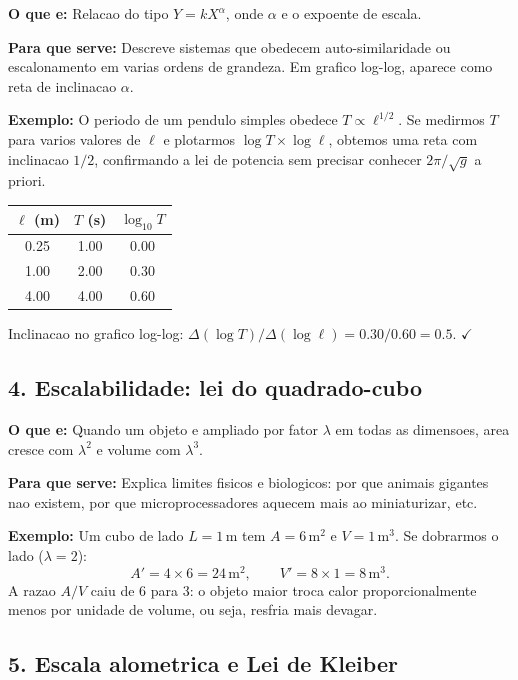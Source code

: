 \documentclass[12pt,a4paper,oneside]{book}
\theoremstyle{definition}
\begin{document}
\textbf{O que e:}
Relacao do tipo $Y = kX^\alpha$, onde $\alpha$ e o expoente de escala.

\textbf{Para que serve:}
Descreve sistemas que obedecem auto-similaridade ou escalonamento em varias ordens
de grandeza. Em grafico log-log, aparece como reta de inclinacao $\alpha$.

\textbf{Exemplo:}
O periodo de um pendulo simples obedece $T \propto \ell^{1/2}$.
Se medirmos $T$ para varios valores de $\ell$ e plotarmos $\log T \times \log \ell$,
obtemos uma reta com inclinacao $1/2$, confirmando a lei de potencia sem precisar
conhecer $2\pi/\sqrt{g}$ a priori.

\begin{center}
\begin{tabular}{ccc}
\toprule
$\ell$ (m) & $T$ (s) & $\log_{10} T$ \\
\midrule
0.25 & 1.00 & 0.00 \\
1.00 & 2.00 & 0.30 \\
4.00 & 4.00 & 0.60 \\
\bottomrule
\end{tabular}
\end{center}
Inclinacao no grafico log-log: $\Delta(\log T)/\Delta(\log \ell) = 0.30/0.60 = 0.5$. $\checkmark$

\subsection*{4. Escalabilidade: lei do quadrado-cubo}

\textbf{O que e:}
Quando um objeto e ampliado por fator $\lambda$ em todas as dimensoes,
area cresce com $\lambda^2$ e volume com $\lambda^3$.

\textbf{Para que serve:}
Explica limites fisicos e biologicos: por que animais gigantes nao existem,
por que microprocessadores aquecem mais ao miniaturizar, etc.

\textbf{Exemplo:}
Um cubo de lado $L=1\,\text{m}$ tem $A=6\,\text{m}^2$ e $V=1\,\text{m}^3$.
Se dobrarmos o lado ($\lambda=2$):
\[
A' = 4\times 6 = 24\,\text{m}^2,\qquad V' = 8\times 1 = 8\,\text{m}^3.
\]
A razao $A/V$ caiu de 6 para 3: o objeto maior troca calor proporcionalmente menos
por unidade de volume, ou seja, resfria mais devagar.

\subsection*{5. Escala alometrica e Lei de Kleiber}
\end{document}
